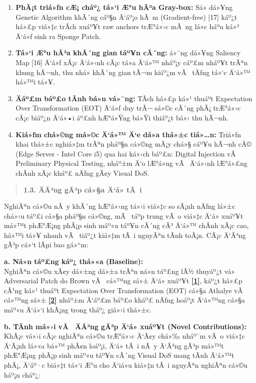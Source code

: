 \documentclass[]{article}
\begin{document}
\begin{enumerate}
\def\labelenumi{\arabic{enumi}.}
\item
  \textbf{PhÃ¡t triá»ƒn cÆ¡ cháº¿ tá»‘i Æ°u hÃ³a Gray-box:} Sá»­ dá»¥ng Genetic 
  Algorithm khÃ´ng cáº§n Ä‘áº¡o hÃ m (Gradient-free) {[}17{]} káº¿t há»£p viá»‡c trÃ­ch 
  xuáº¥t raw anchors trÆ°á»›c mÃ ng lá»c háº­u ká»³ Ä‘á»ƒ sinh ra Sponge Patch.
\item
  \textbf{Tá»‘i Æ°u hÃ³a khÃ´ng gian táº¥n cÃ´ng:} á»¨ng dá»¥ng Saliency Map
  {[}16{]} Ä‘á»ƒ xÃ¡c Ä‘á»‹nh cÃ¡c tá»a Ä‘á»™ nháº¡y cáº£m nháº¥t trÃªn khung hÃ¬nh, thu nhá»
  khÃ´ng gian tÃ¬m kiáº¿m vÃ  tÄƒng tá»‘c Ä‘á»™ há»™i tá»¥.
\item
  \textbf{Äáº£m báº£o tÃ­nh bá»n vá»¯ng:} TÃ­ch há»£p ká»¹ thuáº­t Expectation Over
  Transformation (EOT) Ä‘á»ƒ duy trÃ¬ sá»©c cÃ´ng phÃ¡ trÆ°á»›c cÃ¡c biáº¿n Ä‘á»•i áº£nh
  hÆ°á»Ÿng bá»Ÿi thiáº¿t bá»‹ thu hÃ¬nh.
\item
  \textbf{Kiá»ƒm chá»©ng má»©c Ä‘á»™ Ä‘e dá»a thá»±c tiá»…n:} Triá»ƒn khai thá»±c nghiá»‡m
  trÃªn pháº§n cá»©ng mÃ¡y chá»§ cáº¥u hÃ¬nh cÅ© (Edge Server - Intel Core i5) qua
  hai ká»‹ch báº£n: Digital Injection vÃ  Preliminary Physical Testing, nháº±m Ä‘o 
  lÆ°á»ng vÃ  Ä‘á»‹nh lÆ°á»£ng chÃ­nh xÃ¡c kháº£ nÄƒng gÃ¢y Visual DoS.
\end{enumerate}

\begin{quote}
\textbf{1.3. ÄÃ³ng gÃ³p cá»§a Ä‘á» tÃ i}
\end{quote}

NghiÃªn cá»©u nÃ y khÃ´ng hÆ°á»›ng tá»›i viá»‡c so sÃ¡nh nÄƒng lá»±c chá»‹u táº£i cá»§a pháº§n
cá»©ng, mÃ  táº­p trung vÃ o viá»‡c Ä‘á» xuáº¥t má»™t phÆ°Æ¡ng phÃ¡p sinh máº«u táº¥n cÃ´ng cÃ³
Ä‘á»™ chÃ­nh xÃ¡c cao, há»™i tá»¥ nhanh vÃ  tiáº¿t kiá»‡m tÃ i nguyÃªn tÃ­nh toÃ¡n. CÃ¡c
Ä‘Ã³ng gÃ³p cá»‘t lÃµi bao gá»“m:

\textbf{a. Ná»n táº£ng káº¿ thá»«a (Baseline):}\\
NghiÃªn cá»©u xÃ¢y dá»±ng dá»±a trÃªn ná»n táº£ng lÃ½ thuyáº¿t vá» Adversarial Patch do 
Brown vÃ  cá»™ng sá»± Ä‘á» xuáº¥t \hyperref[TL1]{\textbf{{[}1{]}}}, káº¿t há»£p cÃ¹ng 
ká»¹ thuáº­t Expectation Over Transformation (EOT) cá»§a Athalye vÃ 
cá»™ng sá»± \hyperref[TL2]{\textbf{{[}2{]}}} nháº±m Ä‘áº£m báº£o kháº£ nÄƒng hoáº¡t Ä‘á»™ng
cá»§a máº«u Ä‘á»‘i khÃ¡ng trong tháº¿ giá»›i thá»±c.

\textbf{b. TÃ­nh má»›i vÃ  ÄÃ³ng gÃ³p Ä‘á» xuáº¥t (Novel Contributions):}\\
KhÃ¡c vá»›i cÃ¡c nghiÃªn cá»©u trÆ°á»›c Ä‘Ã¢y chá»‰ nháº¯m vÃ o viá»‡c Ä‘Ã¡nh lá»«a bá»™ phÃ¢n
loáº¡i, Ä‘á» tÃ i nÃ y Ä‘Ã³ng gÃ³p má»™t phÆ°Æ¡ng phÃ¡p sinh máº«u táº¥n cÃ´ng Visual DoS
mang tÃ­nh Ä‘á»™t phÃ¡, Ä‘áº·c biá»‡t tá»‘i Æ°u cho Ä‘iá»u kiá»‡n tÃ i nguyÃªn nghiÃªn cá»©u
háº¡n cháº¿:
\end{document}
